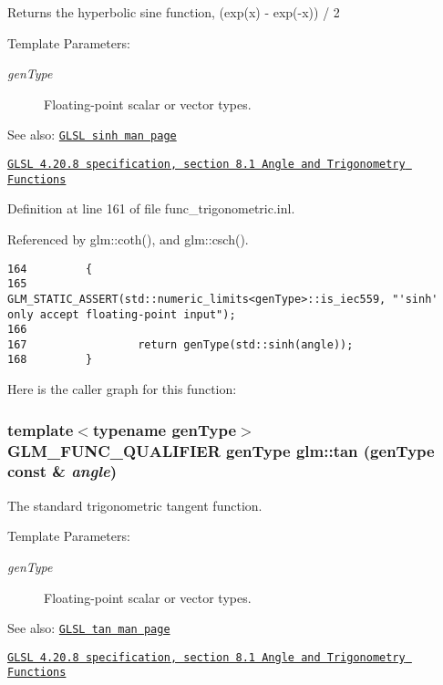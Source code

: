 Returns the hyperbolic sine function, (exp(x) - exp(-x)) / 2

\begin{Desc}
\item[Template Parameters:]
\begin{description}
\item[{\em genType}]Floating-point scalar or vector types.\end{description}
\end{Desc}
\begin{Desc}
\item[See also:]\href{http://www.opengl.org/sdk/docs/manglsl/xhtml/sinh.xml}{\tt GLSL sinh man page} 

\href{http://www.opengl.org/registry/doc/GLSLangSpec.4.20.8.pdf}{\tt GLSL 4.20.8 specification, section 8.1 Angle and Trigonometry Functions} \end{Desc}


Definition at line 161 of file func\_\-trigonometric.inl.

Referenced by glm::coth(), and glm::csch().

\begin{Code}\begin{verbatim}164         {
165                 GLM_STATIC_ASSERT(std::numeric_limits<genType>::is_iec559, "'sinh' only accept floating-point input");
166 
167                 return genType(std::sinh(angle));
168         }
\end{verbatim}
\end{Code}




Here is the caller graph for this function:\hypertarget{group__core__func__trigonometric_g93a81f04757351ba92d924e237cbeb61}{
\subsubsection[tan]{\setlength{\rightskip}{0pt plus 5cm}template$<$typename genType$>$ GLM\_\-FUNC\_\-QUALIFIER genType glm::tan (genType const \& {\em angle})}}
\label{group__core__func__trigonometric_g93a81f04757351ba92d924e237cbeb61}


The standard trigonometric tangent function.

\begin{Desc}
\item[Template Parameters:]
\begin{description}
\item[{\em genType}]Floating-point scalar or vector types.\end{description}
\end{Desc}
\begin{Desc}
\item[See also:]\href{http://www.opengl.org/sdk/docs/manglsl/xhtml/tan.xml}{\tt GLSL tan man page} 

\href{http://www.opengl.org/registry/doc/GLSLangSpec.4.20.8.pdf}{\tt GLSL 4.20.8 specification, section 8.1 Angle and Trigonometry Functions} \end{Desc}


